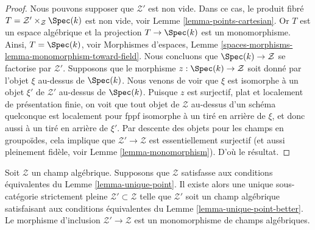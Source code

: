 \begin{proof}
Nous pouvons supposer que $\mathcal{Z}'$ est non vide. Dans ce cas, le
produit fibré $T = \mathcal{Z}' \times_\mathcal{Z} \Spec(k)$
est non vide, voir
Lemme \ref{lemma-points-cartesian}.
Or $T$ est un espace algébrique et la projection $T \to \Spec(k)$
est un monomorphisme. Ainsi, $T = \Spec(k)$, voir
Morphismes d'espaces, Lemme
\ref{spaces-morphisms-lemma-monomorphism-toward-field}.
Nous concluons que $\Spec(k) \to \mathcal{Z}$ se factorise par
$\mathcal{Z}'$. Supposons que le morphisme $z : \Spec(k) \to \mathcal{Z}$
soit donné par l'objet $\xi$ au-dessus de $\Spec(k)$. Nous venons de voir que
$\xi$ est isomorphe à un objet $\xi'$ de $\mathcal{Z}'$ au-dessus de
$\Spec(k)$. Puisque $z$
est surjectif, plat et localement de présentation finie, on voit que
tout objet de $\mathcal{Z}$ au-dessus d'un schéma quelconque est localement pour fppf isomorphe
à un tiré en arrière de $\xi$, et donc aussi à un tiré en arrière de $\xi'$. Par descente des
objets pour les champs en groupoïdes, cela implique que
$\mathcal{Z}' \to \mathcal{Z}$ est essentiellement surjectif (et aussi
pleinement fidèle, voir
Lemme \ref{lemma-monomorphism}).
D'où le résultat.
\end{proof}

\begin{lemma}
\label{lemma-improve-unique-point}
Soit $\mathcal{Z}$ un champ algébrique. Supposons que $\mathcal{Z}$ satisfasse
aux conditions équivalentes du
Lemme \ref{lemma-unique-point}.
Il existe alors une unique sous-catégorie strictement pleine
$\mathcal{Z}' \subset \mathcal{Z}$ telle que
$\mathcal{Z}'$ soit un champ algébrique satisfaisant aux conditions équivalentes du
Lemme \ref{lemma-unique-point-better}.
Le morphisme d'inclusion $\mathcal{Z}' \to \mathcal{Z}$ est un monomorphisme
de champs algébriques.
\end{lemma}


